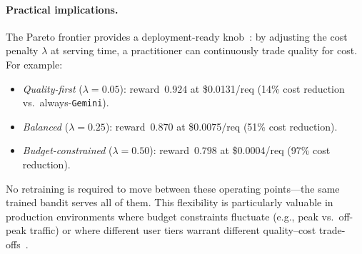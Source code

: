 \paragraph{Practical implications.}
The Pareto frontier provides a deployment-ready
knob~\cite{wang2025barp, li2025llmbandit}: by adjusting
the cost penalty $\lambda$ at serving time, a practitioner can
continuously trade quality for cost.  For example:
\begin{itemize}[nosep,leftmargin=*]
    \item \emph{Quality-first} ($\lambda{=}0.05$): reward~$0.924$
          at \$0.0131/req (14\% cost reduction vs.\
          always-\texttt{Gemini}).
    \item \emph{Balanced} ($\lambda{=}0.25$): reward~$0.870$ at
          \$0.0075/req (51\% cost reduction).
    \item \emph{Budget-constrained} ($\lambda{=}0.50$): reward~$0.798$
          at \$0.0004/req (97\% cost reduction).
\end{itemize}
No retraining is required to move between these operating
points---the same trained bandit serves all of them.  This
flexibility is particularly valuable in production environments
where budget constraints fluctuate (e.g., peak vs.\ off-peak
traffic) or where different user tiers warrant different
quality--cost trade-offs~\cite{chen2023frugalgpt}.
